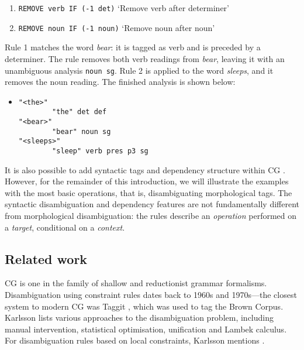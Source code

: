 \begin{enumerate}
\def\labelenumi{\arabic{enumi}.}
\itemsep1pt\parskip0pt
\item \texttt{REMOVE verb IF (-1 det)}
  `Remove verb after determiner'
\item  \texttt{REMOVE noun IF (-1 noun)}
  `Remove noun after noun'
\end{enumerate}

\noindent Rule 1 matches the word \emph{bear}: it is tagged as verb and is
preceded by a determiner. The rule removes both verb readings from
\emph{bear}, leaving it with an unambiguous analysis \texttt{noun sg}.
Rule 2 is applied to the word \emph{sleeps}, and it removes the noun
reading. The finished analysis is shown below:

\begin{itemize}
\item[] 
\begin{verbatim}
"<the>"
        "the" det def
"<bear>"
        "bear" noun sg
"<sleeps>"
        "sleep" verb pres p3 sg
\end{verbatim}
\end{itemize}

It is also possible to add syntactic tags and dependency structure within CG \cite{vislcg3,bick2015}.
However, for the remainder of this introduction, we will illustrate the examples with the 
most basic operations, that is, disambiguating morphological tags.
The syntactic disambiguation and dependency features are not fundamentally
different from morphological disambiguation: the rules describe an \emph{operation}
performed on a \emph{target}, conditional on a \emph{context}.

\subsection{Related work}

CG is one in the family of shallow and reductionist grammar formalisms. Disambiguation using constraint rules dates back to 1960s and 1970s---the closest system to modern CG was Taggit \cite{taggit}, which was used to tag the Brown Corpus.
Karlsson \cite{karlsson1995constraint} lists various approaches to the disambiguation 
problem, including manual intervention, statistical optimisation, unification and Lambek calculus. 
For disambiguation rules based on local constraints, Karlsson mentions \cite{hindle1989disamrules,herz1991local}.


